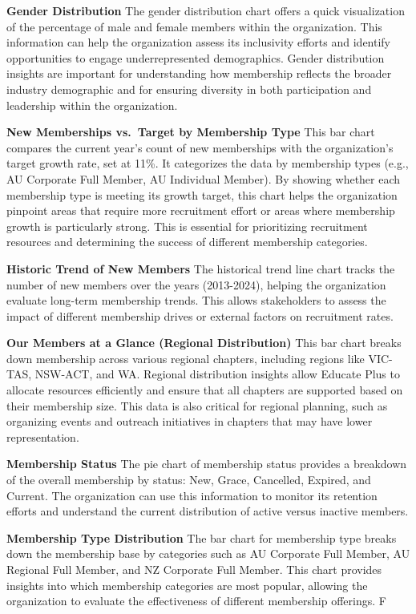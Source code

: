 \documentclass[11pt,a4paper,]{article}
\begin{document}
\textbf{Gender Distribution}
The gender distribution chart offers a quick visualization of the percentage of male and female members within the organization. This information can help the organization assess its inclusivity efforts and identify opportunities to engage underrepresented demographics. Gender distribution insights are important for understanding how membership reflects the broader industry demographic and for ensuring diversity in both participation and leadership within the organization.

\textbf{New Memberships vs.~Target by Membership Type}
This bar chart compares the current year's count of new memberships with the organization's target growth rate, set at 11\%. It categorizes the data by membership types (e.g., AU Corporate Full Member, AU Individual Member). By showing whether each membership type is meeting its growth target, this chart helps the organization pinpoint areas that require more recruitment effort or areas where membership growth is particularly strong. This is essential for prioritizing recruitment resources and determining the success of different membership categories.

\textbf{Historic Trend of New Members}
The historical trend line chart tracks the number of new members over the years (2013-2024), helping the organization evaluate long-term membership trends. This allows stakeholders to assess the impact of different membership drives or external factors on recruitment rates.

\textbf{Our Members at a Glance (Regional Distribution)}
This bar chart breaks down membership across various regional chapters, including regions like VIC-TAS, NSW-ACT, and WA. Regional distribution insights allow Educate Plus to allocate resources efficiently and ensure that all chapters are supported based on their membership size. This data is also critical for regional planning, such as organizing events and outreach initiatives in chapters that may have lower representation.

\textbf{Membership Status}
The pie chart of membership status provides a breakdown of the overall membership by status: New, Grace, Cancelled, Expired, and Current. The organization can use this information to monitor its retention efforts and understand the current distribution of active versus inactive members.

\textbf{Membership Type Distribution}
The bar chart for membership type breaks down the membership base by categories such as AU Corporate Full Member, AU Regional Full Member, and NZ Corporate Full Member. This chart provides insights into which membership categories are most popular, allowing the organization to evaluate the effectiveness of different membership offerings. F
\end{document}
